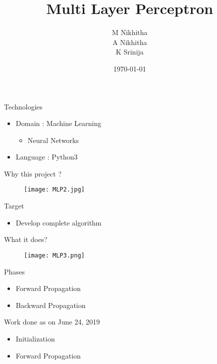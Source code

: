 \documentclass{beamer}
\title{Multi Layer Perceptron }
\author{ M Nikhitha \\ A Nikhitha \\ K Srinija}
\institute[WE]{ TalentSprint - WE program }
\date{\today}
\begin{document}
\begin{frame}
  \titlepage
\end{frame}



\begin{frame}{Technologies}
\begin{itemize}
  \item  Domain : Machine Learning
  \begin{itemize}
      \item Neural Networks
  \end{itemize}
  \item Language : Python3
\end{itemize}
\end{frame}

\begin{frame}{Why this project ?}
\begin{figure}
    \texttt{[image: MLP2.jpg]}
\end{figure}
\end{frame}

\begin{frame}{Target}
\begin{itemize}
  \item Develop complete algorithm 
\end{itemize}
\end{frame}

\begin{frame}{What it does?}
\begin{figure}
    \texttt{[image: MLP3.png]}
\end{figure}
\end{frame}


    
\begin{frame}{Phases}
    \begin{itemize}
        \item 
        Forward Propagation
        \item 
        Backward Propagation
    \end{itemize}
\end{frame}
    
\begin{frame}{Work done as on June 24, 2019}
    \begin{itemize}
        \item Initialization
        \item Forward Propagation
       
            
    \end{itemize}
\end{frame}
\end{document}
